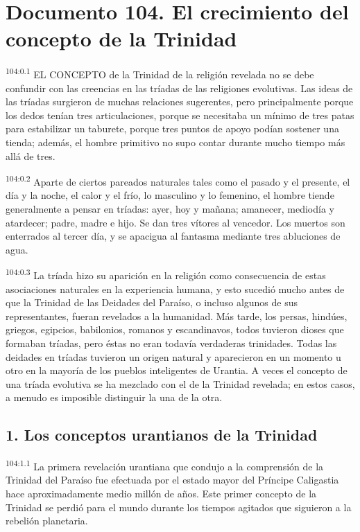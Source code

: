 \chapter{Documento 104. El crecimiento del concepto de la Trinidad}
\par
\textsuperscript{104:0.1} EL CONCEPTO de la Trinidad de la religión revelada no se debe confundir con las creencias en las tríadas de las religiones evolutivas. Las ideas de las tríadas surgieron de muchas relaciones sugerentes, pero principalmente porque los dedos tenían tres articulaciones, porque se necesitaba un mínimo de tres patas para estabilizar un taburete, porque tres puntos de apoyo podían sostener una tienda; además, el hombre primitivo no supo contar durante mucho tiempo más allá de tres.

\par
\textsuperscript{104:0.2} Aparte de ciertos pareados naturales tales como el pasado y el presente, el día y la noche, el calor y el frío, lo masculino y lo femenino, el hombre tiende generalmente a pensar en tríadas: ayer, hoy y mañana; amanecer, mediodía y atardecer; padre, madre e hijo. Se dan tres vítores al vencedor. Los muertos son enterrados al tercer día, y se apacigua al fantasma mediante tres abluciones de agua.

\par
\textsuperscript{104:0.3} La tríada hizo su aparición en la religión como consecuencia de estas asociaciones naturales en la experiencia humana, y esto sucedió mucho antes de que la Trinidad de las Deidades del Paraíso, o incluso algunos de sus representantes, fueran revelados a la humanidad. Más tarde, los persas, hindúes, griegos, egipcios, babilonios, romanos y escandinavos, todos tuvieron dioses que formaban tríadas, pero éstas no eran todavía verdaderas trinidades. Todas las deidades en tríadas tuvieron un origen natural y aparecieron en un momento u otro en la mayoría de los pueblos inteligentes de Urantia. A veces el concepto de una tríada evolutiva se ha mezclado con el de la Trinidad revelada; en estos casos, a menudo es imposible distinguir la una de la otra.

\section*{1. Los conceptos urantianos de la Trinidad}
\par
\textsuperscript{104:1.1} La primera revelación urantiana que condujo a la comprensión de la Trinidad del Paraíso fue efectuada por el estado mayor del Príncipe Caligastia hace aproximadamente medio millón de años. Este primer concepto de la Trinidad se perdió para el mundo durante los tiempos agitados que siguieron a la rebelión planetaria.

